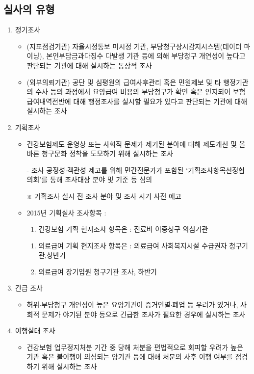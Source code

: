 \subsection{실사의 유형}
\begin{enumerate}[가.]\tightlist
\item 정기조사
	\begin{itemize}\tightlist
	\item (지표점검기관) 자율시정통보 미시정 기관, 부당청구상시감지시스템(데이터 마이닝), 본인부담금과다징수 다발생 기관 등에 의해 부당청구 개연성이 높다고 판단되는 기관에 대해 실시하는 통상적 조사
	\item (외부의뢰기관) 공단 및 심평원의 급여사후관리 혹은 민원제보 및 타 행정기관의 수사 등의 과정에서 요양급여 비용의 부당청구가 확인 혹은 인지되어 보험급여내역전반에 대해 행정조사를 실시할 필요가 있다고 판단되는 기관에 대해 실시하는 조사
	\end{itemize}
\item 기획조사
	\begin{itemize}\tightlist
	\item 건강보험제도 운영상 또는 사회적 문제가 제기된 분야에 대해 제도개선 및 올바른 청구문화 정착을 도모하기 위해 실시하는 조사 \par
- 조사 공정성$\cdot$객관성 제고를 위해 민간전문가가 포함된 ‘기획조사항목선정협의회’를 통해 조사대상 분야 및 기준 등 심의\par
※ 기획조사 실시 전 조사 분야 및 조사 시기 사전 예고
	\item 2015년 기획실사 조사항목 :  
		\begin{enumerate}[①]\tightlist
		\item 건강보험 기획 현지조사 항목은 : 진료비 이중청구 의심기관
		\end{enumerate}
		\begin{enumerate}[①]\tightlist
		\item 의료급여 기획 현지조사 항목은 : 의료급여 사회복지시설 수급권자 청구기관,상반기 
		\item 의료급여 장기입원 청구기관 조사, 하반기
		\end{enumerate}
	\end{itemize}
\item 긴급 조사
	\begin{itemize}\tightlist
	\item 허위$\cdot$부당청구 개연성이 높은 요양기관이 증거인멸$\cdot$폐업 등 우려가 있거나, 사회적 문제가 야기된 분야 등으로 긴급한 조사가 필요한 경우에 실시하는 조사
	\end{itemize}
\item 이행실태 조사
	\begin{itemize}\tightlist
	\item 건강보험 업무정지처분 기간 중 당해 처분을 편법적으로 회피할 우려가 높은 기관 혹은 불이행이 의심되는 양기관 등에 대해 처분의 사후 이행 여부를 점검하기 위해 실시하는 조사
	\end{itemize}
\end{enumerate}

